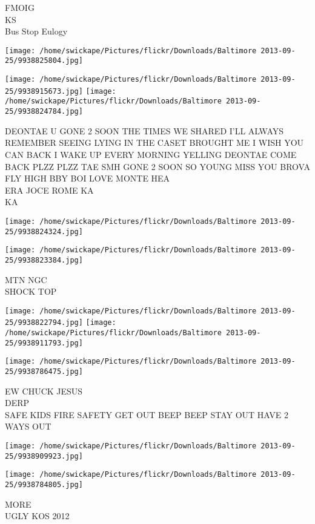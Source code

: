 \documentclass[10pt,letterpaper]{article}
\begin{document}
FMOIG\\
KS\\
Bus Stop Eulogy
\pagebreak

\texttt{[image: /home/swickape/Pictures/flickr/Downloads/Baltimore 2013-09-25/9938825804.jpg]}

\vspace{0.25in}
\texttt{[image: /home/swickape/Pictures/flickr/Downloads/Baltimore 2013-09-25/9938915673.jpg]}
\texttt{[image: /home/swickape/Pictures/flickr/Downloads/Baltimore 2013-09-25/9938824784.jpg]}

DEONTAE U GONE 2 SOON THE TIMES WE SHARED I'LL ALWAYS REMEMBER SEEING LYING IN THE CASET BROUGHT ME I WISH YOU CAN BACK I WAKE UP EVERY MORNING YELLING DEONTAE COME BACK PLZZ PLZZ TAE SMH GONE 2 SOON SO YOUNG MISS YOU BROVA FLY HIGH BBY BOI LOVE MONTE HEA\\
ERA JOCE ROME KA\\
KA
\pagebreak

\texttt{[image: /home/swickape/Pictures/flickr/Downloads/Baltimore 2013-09-25/9938824324.jpg]}

\vspace{0.25in}
\texttt{[image: /home/swickape/Pictures/flickr/Downloads/Baltimore 2013-09-25/9938823384.jpg]}

MTN NGC\\
SHOCK TOP
\pagebreak

\texttt{[image: /home/swickape/Pictures/flickr/Downloads/Baltimore 2013-09-25/9938822794.jpg]}
\texttt{[image: /home/swickape/Pictures/flickr/Downloads/Baltimore 2013-09-25/9938911793.jpg]}

\vspace{0.25in}
\texttt{[image: /home/swickape/Pictures/flickr/Downloads/Baltimore 2013-09-25/9938786475.jpg]}

EW CHUCK JESUS\\
DERP\\
SAFE KIDS FIRE SAFETY GET OUT BEEP BEEP STAY OUT HAVE 2 WAYS OUT
\pagebreak

\texttt{[image: /home/swickape/Pictures/flickr/Downloads/Baltimore 2013-09-25/9938909923.jpg]}

\vspace{0.25in}
\texttt{[image: /home/swickape/Pictures/flickr/Downloads/Baltimore 2013-09-25/9938784805.jpg]}

MORE\\
UGLY KOS 2012
\pagebreak
\end{document}
